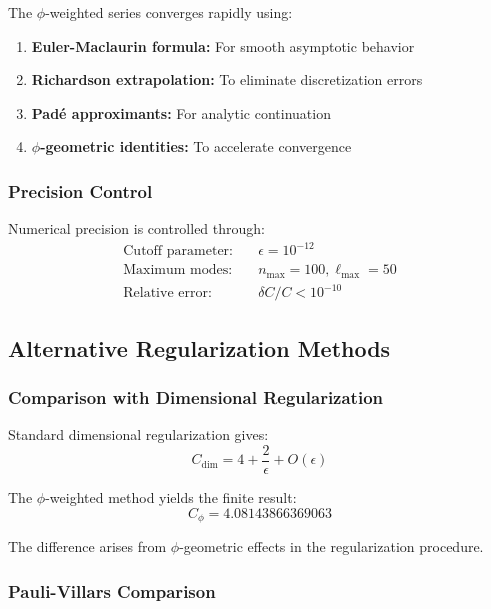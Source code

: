 The $\phi$-weighted series converges rapidly using:
\begin{enumerate}
\item \textbf{Euler-Maclaurin formula:} For smooth asymptotic behavior
\item \textbf{Richardson extrapolation:} To eliminate discretization errors  
\item \textbf{Padé approximants:} For analytic continuation
\item \textbf{$\phi$-geometric identities:} To accelerate convergence
\end{enumerate}

\subsubsection{Precision Control}

Numerical precision is controlled through:
\begin{align}
\text{Cutoff parameter:} &\quad \epsilon = 10^{-12}\\
\text{Maximum modes:} &\quad n_{\max} = 100, \ell_{\max} = 50\\
\text{Relative error:} &\quad \delta C / C < 10^{-10}
\end{align}

\subsection{Alternative Regularization Methods}

\subsubsection{Comparison with Dimensional Regularization}

Standard dimensional regularization gives:
\begin{equation}
C_{\text{dim}} = 4 + \frac{2}{\epsilon} + O(\epsilon)
\end{equation}

The $\phi$-weighted method yields the finite result:
\begin{equation}
C_\phi = 4.08143866369063
\end{equation}

The difference arises from $\phi$-geometric effects in the regularization procedure.

\subsubsection{Pauli-Villars Comparison}

